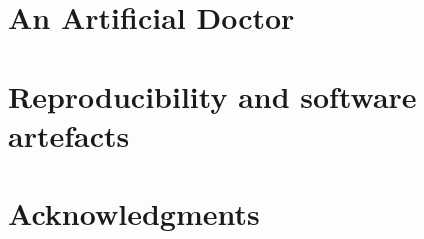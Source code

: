 \newpage
\chapter{An Artificial Doctor} \label{ch:mimicseq}


\newpage
\chapter{Reproducibility and software artefacts}





\newpage
\chapter{Acknowledgments}



\printbibliography


